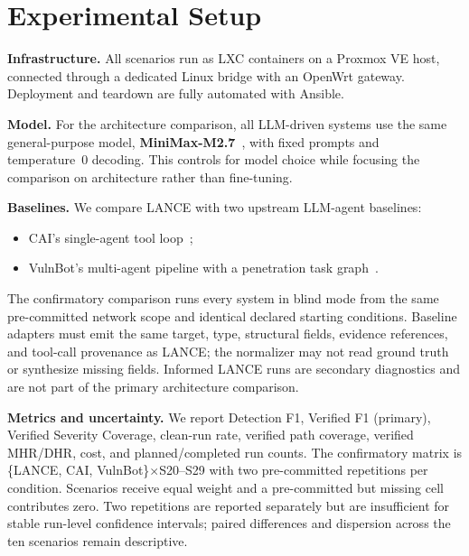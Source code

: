 \documentclass[conference,compsoc]{IEEEtran}
\newcommand{\harnessname}{\textsc{LANCE}\xspace}
\begin{document}
\section{Experimental Setup}
\label{sec:setup}

\textbf{Infrastructure.}
All scenarios run as LXC containers on a Proxmox VE host, connected through a dedicated Linux bridge with an OpenWrt gateway. Deployment and teardown are fully automated with Ansible.

\textbf{Model.}
For the architecture comparison, all LLM-driven systems use the same general-purpose model, \textbf{MiniMax-M2.7}~\cite{minimax27}, with fixed prompts and temperature~0 decoding. This controls for model choice while focusing the comparison on architecture rather than fine-tuning.

\textbf{Baselines.}
We compare \harnessname{} with two upstream LLM-agent baselines:
\begin{itemize}[leftmargin=*,nosep]
  \item CAI's single-agent tool loop~\cite{cai25};
  \item VulnBot's multi-agent pipeline with a penetration task graph~\cite{vulnbot25}.
\end{itemize}
The confirmatory comparison runs every system in blind mode from the same pre-committed network scope and identical declared starting conditions. Baseline adapters must emit the same target, type, structural fields, evidence references, and tool-call provenance as \harnessname{}; the normalizer may not read ground truth or synthesize missing fields. Informed \harnessname{} runs are secondary diagnostics and are not part of the primary architecture comparison.

\textbf{Metrics and uncertainty.}
We report Detection F1, Verified F1 (primary), Verified Severity Coverage, clean-run rate, verified path coverage, verified MHR/DHR, cost, and planned/completed run counts. The confirmatory matrix is \{\harnessname{}, CAI, VulnBot\}$\times$S20--S29 with two pre-committed repetitions per condition. Scenarios receive equal weight and a pre-committed but missing cell contributes zero. Two repetitions are reported separately but are insufficient for stable run-level confidence intervals; paired differences and dispersion across the ten scenarios remain descriptive.

\end{document}
